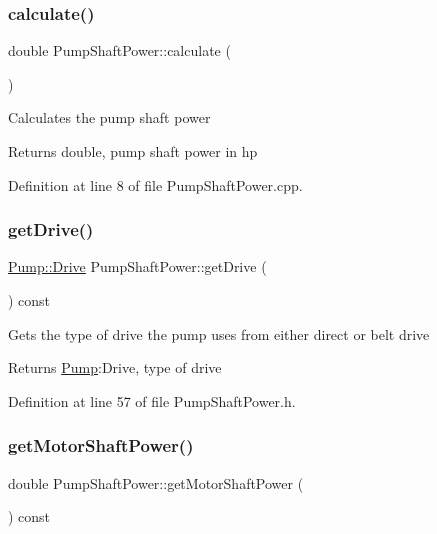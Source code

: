 \subsubsection{\texorpdfstring{calculate()}{calculate()}}
{\footnotesize\ttfamily double Pump\+Shaft\+Power\+::calculate (\begin{DoxyParamCaption}{ }\end{DoxyParamCaption})}

Calculates the pump shaft power \begin{DoxyReturn}{Returns}
double, pump shaft power in hp 
\end{DoxyReturn}


Definition at line 8 of file Pump\+Shaft\+Power.\+cpp.

\mbox{\label{class_pump_shaft_power_a3d6529d7f5ce8ef194af9abe5e6399b6}} 
\subsubsection{\texorpdfstring{get\+Drive()}{getDrive()}}
{\footnotesize\ttfamily \hyperlink{class_pump_a32bf0ade131a11bb3b3fb374f638e983}{Pump\+::\+Drive} Pump\+Shaft\+Power\+::get\+Drive (\begin{DoxyParamCaption}{ }\end{DoxyParamCaption}) const\hspace{0.3cm}{\ttfamily [inline]}}

Gets the type of drive the pump uses from either direct or belt drive \begin{DoxyReturn}{Returns}
\hyperlink{class_pump}{Pump}\+:Drive, type of drive 
\end{DoxyReturn}


Definition at line 57 of file Pump\+Shaft\+Power.\+h.

\mbox{\label{class_pump_shaft_power_acb91eadb960f946ffee5373d4839a5be}} 
\subsubsection{\texorpdfstring{get\+Motor\+Shaft\+Power()}{getMotorShaftPower()}}
{\footnotesize\ttfamily double Pump\+Shaft\+Power\+::get\+Motor\+Shaft\+Power (\begin{DoxyParamCaption}{ }\end{DoxyParamCaption}) const\hspace{0.3cm}{\ttfamily [inline]}}

